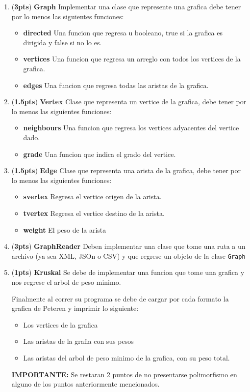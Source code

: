 \documentclass{article}
\newcommand{\grade}[1]{(\textbf{#1pts}) }
\begin{document}
\begin{enumerate}

\item \grade{3} \textbf{Graph} Implementar una clase que represente una grafica debe tener por lo menos las siguientes funciones:

  \begin{itemize}
  \item \textbf{directed} Una funcion que regresa u booleano, true si la grafica es dirigida y false si no lo es.
  \item \textbf{vertices} Una funcion que regresa un arreglo con todos los vertices de la grafica.
  \item \textbf{edges} Una funcion que regresa todas las aristas de la grafica.
  \end{itemize}

\item \grade{1.5} \textbf{Vertex} Clase que representa un vertice de la grafica, debe tener por lo menos las siguientes funciones:

  \begin{itemize}
  \item \textbf{neighbours} Una funcion que regresa los vertices adyacentes del vertice dado.
  \item \textbf{grade} Una funcion que indica el grado del vertice.
  \end{itemize}

\item \grade{1.5} \textbf{Edge} Clase que representa una arista de la grafica, debe tener por lo menos las siguientes funciones:

  \begin{itemize}
  \item \textbf{svertex} Regresa el vertice origen de la arista.
  \item \textbf{tvertex} Regresa el vertice destino de la arista.
  \item \textbf{weight} El peso de la arista
  \end{itemize}

 \item \grade{3} \textbf{GraphReader} Deben implementar una clase que tome una ruta a un archivo (ya sea XML, JSOn o CSV) y que regrese un objeto de la clase \texttt{Graph}

 \item \grade{1} \textbf{Kruskal} Se debe de implementar una funcion que tome una grafica y nos regrese el arbol de peso minimo.

   Finalmente al correr su programa se debe de cargar por cada formato la grafica de Peteren y imprimir lo siguiente:
   \begin{itemize}
   \item Los vertices de la grafica
   \item Las aristas de la grafia con sus pesos
   \item Las aristas del arbol de peso minimo de la grafica, con su peso total.
   \end{itemize}

 \textbf{IMPORTANTE:} Se restaran 2 puntos de no presentarse polimorfismo en alguno de los puntos anteriormente mencionados.

\end{enumerate}
\end{document}

